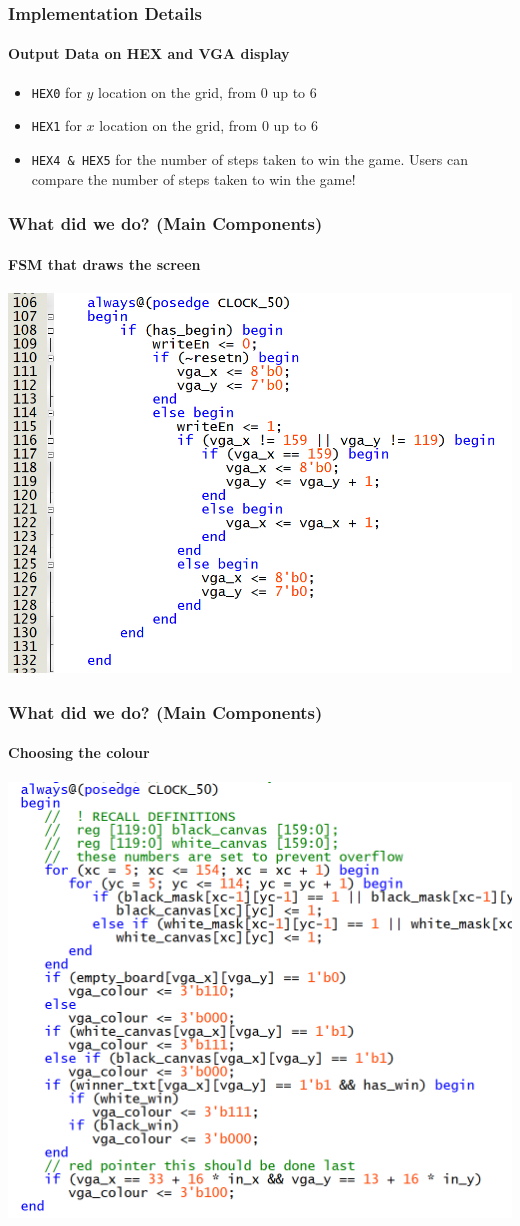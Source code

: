 \documentclass{beamer}
\begin{document}
\begin{frame}
    \frametitle{Implementation Details}
    \framesubtitle{Output Data on HEX and VGA display}
    \begin{itemize}
        \item \texttt{HEX0} for $y$ location on the grid, from 0 up to 6
        \item \texttt{HEX1} for $x$ location on the grid, from 0 up to 6
        \item \texttt{HEX4 \& HEX5} for the number of steps taken to win the game. Users can compare the number of steps taken to win the game!
    \end{itemize}
\end{frame}

\begin{frame}
    \frametitle{What did we do? (Main Components)}
    \framesubtitle{FSM that draws the screen}
    \center \includegraphics[scale=0.4]{screen_fsm.png}
\end{frame}

\begin{frame}
    \frametitle{What did we do? (Main Components)}
    \framesubtitle{Choosing the colour}
    \center \includegraphics[scale=0.4]{color_fsm.png}
\end{frame}
\end{document}
